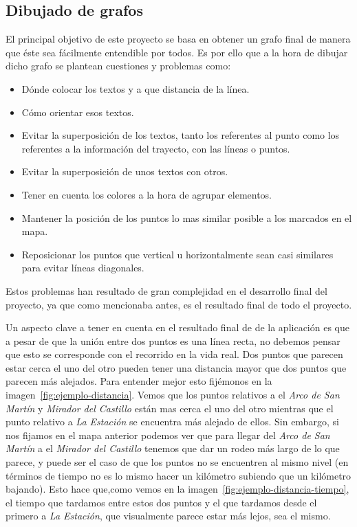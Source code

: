 \subsection{Dibujado de grafos}
El principal objetivo de este proyecto se basa en obtener un grafo final de manera que éste sea fácilmente entendible por todos. Es por ello que a la hora de dibujar dicho grafo se plantean cuestiones y problemas como:
\begin{itemize}
	\item Dónde colocar los textos y a que distancia de la línea.
	\item Cómo orientar esos textos.
	\item Evitar la superposición de los textos, tanto los referentes al punto como los referentes a la información del trayecto, con las líneas o puntos.
	\item Evitar la superposición de unos textos con otros.
	\item Tener en cuenta los colores a la hora de agrupar elementos.
	\item Mantener la posición de los puntos lo mas similar posible a los marcados en el mapa.
	\item Reposicionar los puntos que vertical u horizontalmente sean casi similares para evitar líneas diagonales.
\end{itemize}

Estos problemas han resultado de gran complejidad en el desarrollo final del proyecto, ya que como mencionaba antes, es el resultado final de todo el proyecto.

Un aspecto clave a tener en cuenta en el resultado final de de la aplicación es que a pesar de que la unión entre dos puntos es una línea recta, no debemos pensar que esto se corresponde con el recorrido en la vida real. Dos puntos que parecen estar cerca el uno del otro pueden tener una distancia mayor que dos puntos que parecen más alejados. Para entender mejor esto fijémonos en la imagen~\ref{fig:ejemplo-distancia}. Vemos que los puntos relativos a el \textit{Arco de San Martín} y \textit{Mirador del Castillo} están mas cerca el uno del otro mientras que el punto relativo a \textit{La Estación} se encuentra más alejado de ellos.
Sin embargo, si nos fijamos en el mapa anterior podemos ver que para llegar del \textit{Arco de San Martín} a el \textit{Mirador del Castillo} tenemos que dar un rodeo más largo de lo que parece, y puede ser el caso de que los puntos no se encuentren al mismo nivel (en términos de tiempo no es lo mismo hacer un kilómetro subiendo que un kilómetro bajando). Esto hace que,como vemos en la imagen~\ref{fig:ejemplo-distancia-tiempo}, el tiempo que tardamos entre estos dos puntos y el que tardamos desde el primero a \textit{La Estación}, que visualmente parece estar más lejos, sea el mismo.

